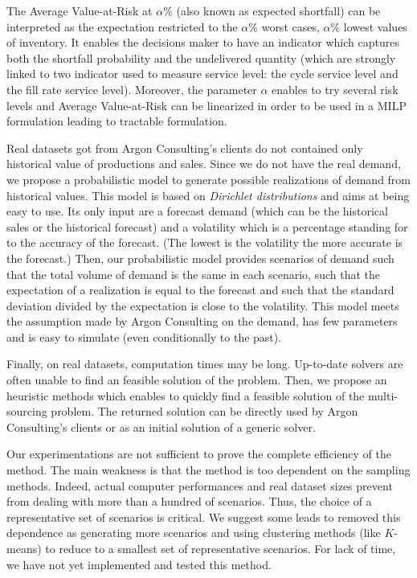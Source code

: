 The Average Value-at-Risk at $\alpha\%$ (also known as expected shortfall) can be interpreted as the expectation restricted to the $\alpha\%$ worst cases, \ie $\alpha\%$ lowest values of inventory.
It enables the decisions maker to have an indicator which captures both the shortfall probability and the undelivered quantity (which are strongly linked to two indicator used to measure service level: the cycle service level and the fill rate service level).
Moreover, the parameter $\alpha$ enables to try several risk levels and Average Value-at-Risk can be linearized in order to be used in a MILP formulation leading to tractable formulation.


\medskip


Real datasets got from Argon Consulting's clients do not contained only historical value of productions and sales.
Since we do not have the real demand, we propose a probabilistic model to generate possible realizations of demand from historical values.
This model is based on \emph{Dirichlet distributions} and aims at being easy to use.
Its only input are a forecast demand (which can be the historical sales or the historical forecast) and a volatility which is a percentage standing for to the accuracy of the forecast.
(The lowest is the volatility the more accurate is the forecast.)
Then, our probabilistic model provides scenarios of demand such that the total volume of demand is the same in each scenario, such that the expectation of a realization is equal to the forecast and such that the standard deviation divided by the expectation is close to the volatility.
This model meets the assumption made by Argon Consulting on the demand, has few parameters and is easy to simulate (even conditionally to the past).


\medskip


Finally, on real datasets, computation times may be long.
Up-to-date solvers are often unable to find an feasible solution of the problem.
Then, we propose an heuristic methods which enables to quickly find a feasible solution of the multi-sourcing problem.
The returned solution can be directly used by Argon Consulting's clients or as an initial solution of a generic solver.


\medskip


Our experimentations are not sufficient to prove the complete efficiency of the method.
The main weakness is that the method is too dependent on the sampling methods.
Indeed, actual computer performances and real dataset sizes prevent from dealing with more than a hundred of scenarios.
Thus, the choice of a representative set of scenarios is critical.
We suggest some leads to removed this dependence as generating more scenarios and using clustering methods (like $K$-means) to reduce to a smallest set of representative scenarios.
For lack of time, we have not yet implemented and tested this method.



